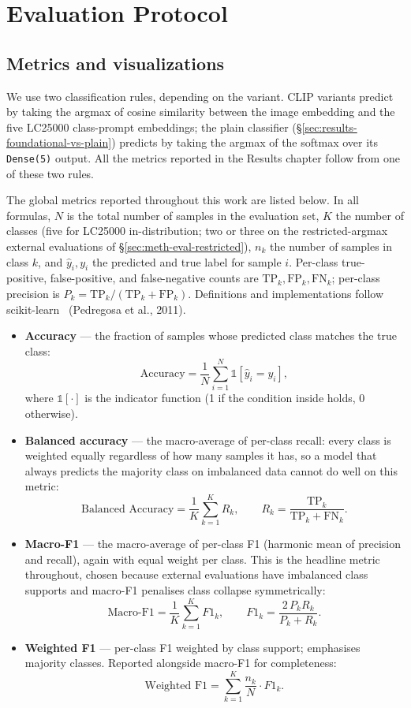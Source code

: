 \FloatBarrier


\section{Evaluation Protocol}
\label{sec:meth-eval}

\subsection{Metrics and visualizations}

We use two classification rules, depending on the variant. CLIP variants predict by taking the argmax of cosine similarity between the image embedding and the five LC25000 class-prompt embeddings; the plain classifier (§\ref{sec:results-foundational-vs-plain}) predicts by taking the argmax of the softmax over its \texttt{Dense(5)} output. All the metrics reported in the Results chapter follow from one of these two rules.

The global metrics reported throughout this work are listed below. In all formulas, $N$ is the total number of samples in the evaluation set, $K$ the number of classes (five for LC25000 in-distribution; two or three on the restricted-argmax external evaluations of §\ref{sec:meth-eval-restricted}), $n_k$ the number of samples in class $k$, and $\hat{y}_i, y_i$ the predicted and true label for sample $i$. Per-class true-positive, false-positive, and false-negative counts are $\mathrm{TP}_k, \mathrm{FP}_k, \mathrm{FN}_k$; per-class precision is $P_k = \mathrm{TP}_k / (\mathrm{TP}_k + \mathrm{FP}_k)$. Definitions and implementations follow scikit-learn~\cite{pedregosa2011sklearn} (Pedregosa et al., 2011).

\begin{itemize}
    \item \textbf{Accuracy} --- the fraction of samples whose predicted class matches the true class:
    $$\text{Accuracy} = \frac{1}{N} \sum_{i=1}^{N} \mathds{1}[\hat{y}_i = y_i],$$
    where $\mathds{1}[\cdot]$ is the indicator function (1 if the condition inside holds, 0 otherwise).
    \item \textbf{Balanced accuracy} --- the macro-average of per-class recall: every class is weighted equally regardless of how many samples it has, so a model that always predicts the majority class on imbalanced data cannot do well on this metric:
    $$\text{Balanced Accuracy} = \frac{1}{K} \sum_{k=1}^{K} R_k, \qquad R_k = \frac{\mathrm{TP}_k}{\mathrm{TP}_k + \mathrm{FN}_k}.$$
    \item \textbf{Macro-F1} --- the macro-average of per-class F1 (harmonic mean of precision and recall), again with equal weight per class. This is the headline metric throughout, chosen because external evaluations have imbalanced class supports and macro-F1 penalises class collapse symmetrically:
    $$\text{Macro-F1} = \frac{1}{K} \sum_{k=1}^{K} F1_k, \qquad F1_k = \frac{2 \, P_k R_k}{P_k + R_k}.$$
    \item \textbf{Weighted F1} --- per-class F1 weighted by class support; emphasises majority classes. Reported alongside macro-F1 for completeness:
    $$\text{Weighted F1} = \sum_{k=1}^{K} \frac{n_k}{N} \cdot F1_k.$$
\end{itemize}

